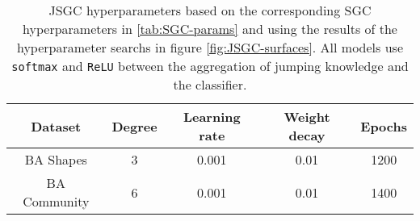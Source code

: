 \begin{table}
    \centering
    \begin{tabular}{c|cccc}
        \textbf{Dataset} &
        \textbf{Degree} &
        \textbf{Learning rate} &
        \textbf{Weight decay} &
        \textbf{Epochs} \\
        \midrule
        BA Shapes       & 3 & 0.001 & 0.01 & 1200 \\
        BA Community    & 6 & 0.001 & 0.01 & 1400 \\
    \end{tabular}
    \caption{JSGC hyperparameters based on the corresponding SGC hyperparameters in \ref{tab:SGC-params} and using the results of the hyperparameter searchs in figure \ref{fig:JSGC-surfaces}. All models use \texttt{softmax} and \texttt{ReLU} between the aggregation of jumping knowledge and the classifier.}
    \label{tab:JSGC-params}
\end{table}


